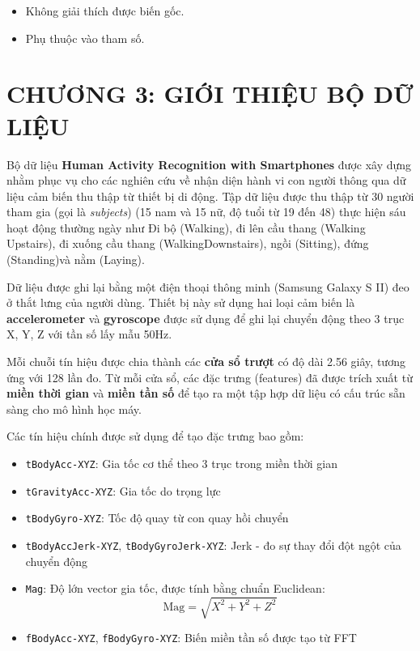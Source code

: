 \documentclass[
]{article}
\providecommand{\tightlist}{%
  \setlength{\itemsep}{0pt}\setlength{\parskip}{0pt}}
\begin{document}
\begin{itemize}
\tightlist
\item
  Không giải thích được biến gốc.
\item
  Phụ thuộc vào tham số.
\end{itemize}

\section*{CHƯƠNG 3: GIỚI THIỆU BỘ DỮ LIỆU}
\setcounter{section}{3}

Bộ dữ liệu \textbf{Human Activity Recognition with Smartphones} được xây
dựng nhằm phục vụ cho các nghiên cứu về nhận diện hành vi con người
thông qua dữ liệu cảm biến thu thập từ thiết bị di động. Tập dữ liệu
được thu thập từ 30 người tham gia (gọi là \emph{subjects}) (15 nam và
15 nữ, độ tuổi từ 19 đến 48) thực hiện sáu hoạt động thường ngày như Đi
bộ (Walking), đi lên cầu thang (Walking Upstairs), đi xuống cầu thang
(WalkingDownstairs), ngồi (Sitting), đứng (Standing)và nằm (Laying).

Dữ liệu được ghi lại bằng một điện thoại thông minh (Samsung Galaxy S
II) đeo ở thắt lưng của người dùng. Thiết bị này sử dụng hai loại cảm
biến là \textbf{accelerometer} và \textbf{gyroscope} được sử dụng để ghi
lại chuyển động theo 3 trục X, Y, Z với tần số lấy mẫu 50Hz.

Mỗi chuỗi tín hiệu được chia thành các \textbf{cửa sổ trượt} có độ dài
2.56 giây, tương ứng với 128 lần đo. Từ mỗi cửa sổ, các đặc trưng
(features) đã được trích xuất từ \textbf{miền thời gian} và \textbf{miền
tần số} để tạo ra một tập hợp dữ liệu có cấu trúc sẵn sàng cho mô hình
học máy.

Các tín hiệu chính được sử dụng để tạo đặc trưng bao gồm:

\begin{itemize}
\tightlist
\item
  \texttt{tBodyAcc-XYZ}: Gia tốc cơ thể theo 3 trục trong miền thời
  gian\\
\item
  \texttt{tGravityAcc-XYZ}: Gia tốc do trọng lực\\
\item
  \texttt{tBodyGyro-XYZ}: Tốc độ quay từ con quay hồi chuyển\\
\item
  \texttt{tBodyAccJerk-XYZ}, \texttt{tBodyGyroJerk-XYZ}: Jerk - đo sự
  thay đổi đột ngột của chuyển động\\
\item
  \texttt{Mag}: Độ lớn vector gia tốc, được tính bằng chuẩn Euclidean:\\
  \[
  \text{Mag} = \sqrt{X^2 + Y^2 + Z^2}
  \]
\item
  \texttt{fBodyAcc-XYZ}, \texttt{fBodyGyro-XYZ}: Biến miền tần số được
  tạo từ FFT
\end{itemize}
\end{document}
